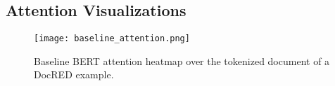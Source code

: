 \documentclass[11pt,a4paper]{article}
\begin{document}
\begin{comment}


\begin{figure}[h]
\framebox{
\parbox{0.45\textwidth}{
\small
\textbf{\textcolor{blue}{DocRED Example} } \newline
\textbf{Context:}  {\textcolor{brown}{[0]}} \textbf{\textcolor{red}{The Legend of Zelda}} : The Minish Cap ( ) is an action - adventure game and the twelfth entry in \textbf{\textcolor{red}{The Legend of Zelda}} series.
{\textcolor{brown}{[1]}} Developed by Capcom and Flagship , with Nintendo overseeing the development process , it was released for the Game Boy Advance handheld game console in Japan and Europe in 2004 and in North America and Australia the following year .
{\textcolor{brown}{[2]}} In June 2014 , it was made available on the Wii U Virtual Console .
{\textcolor{brown}{[3]}} The Minish Cap is the third Zelda game that involves the legend of the Four Sword , expanding on the story of and .
{\textcolor{brown}{[4]}} A magical talking cap named Ezlo can shrink series protagonist \textbf{\textcolor{blue}{Link}} to the size of the Minish , a bug - sized race that live in Hyrule .
{\textcolor{brown}{[5]}} The game retains some common elements from previous Zelda installments , such as the presence of Gorons , while introducing Kinstones and other new gameplay features .
{\textcolor{brown}{[6]}} The Minish Cap was generally well received among critics .
{\textcolor{brown}{[7]}} It was named the 20th best Game Boy Advance game in an IGN feature , and was selected as the 2005 Game Boy Advance Game of the Year by GameSpot .\newline
\textbf{Head Entity:} \textbf{\textcolor{red}{The Legend of Zelda}} \newline
\textbf{Tail Entity:} \textbf{\textcolor{blue}{Link}} \newline
\textbf{Relation:} ``Publisher'' \newline
\textbf{Evidence Sentences:} 0,3,4}
}
\caption{An example of a head/tail entity pair that spans across multiple sentences from DocRED's validation set. Our model is able to highlight the specific areas of the document that is necessary to correctly predict this relation.} 
\label{fig:exp0}
\end{figure}
\end{comment}

\subsection{Attention Visualizations}\label{sec:attn_viz}
\begin{figure}[t]
    \centering
    \texttt{[image: baseline\_attention.png]}
    \caption{Baseline BERT attention heatmap over the tokenized document of a DocRED example.}
\label{fig:baseline_attn}
\end{figure}
\end{document}
